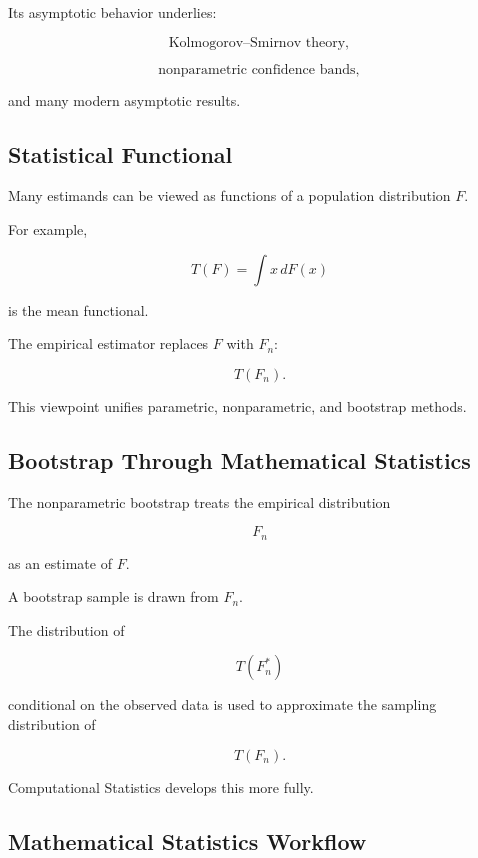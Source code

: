 Its asymptotic behavior underlies:

\[
\boxed{
\text{Kolmogorov--Smirnov theory},
}
\]

\[
\boxed{
\text{nonparametric confidence bands},
}
\]

and many modern asymptotic results.

\subsection{Statistical Functional}
\label{subsec:statistical-functional}

Many estimands can be viewed as functions of a population distribution
\(F\).

For example,

\[
\boxed{
T(F)
=
\int x\,dF(x)
}
\]

is the mean functional.

The empirical estimator replaces \(F\) with \(F_n\):

\[
\boxed{
T(F_n).
}
\]

This viewpoint unifies parametric, nonparametric, and bootstrap methods.

\subsection{Bootstrap Through Mathematical Statistics}
\label{subsec:bootstrap-mathstat}

The nonparametric bootstrap treats the empirical distribution

\[
F_n
\]

as an estimate of \(F\).

A bootstrap sample is drawn from \(F_n\).

The distribution of

\[
\boxed{
T(F_n^*)
}
\]

conditional on the observed data is used to approximate the sampling
distribution of

\[
T(F_n).
\]

Computational Statistics develops this more fully.

\subsection{Mathematical Statistics Workflow}
\label{subsec:mathematical-statistics-workflow}

